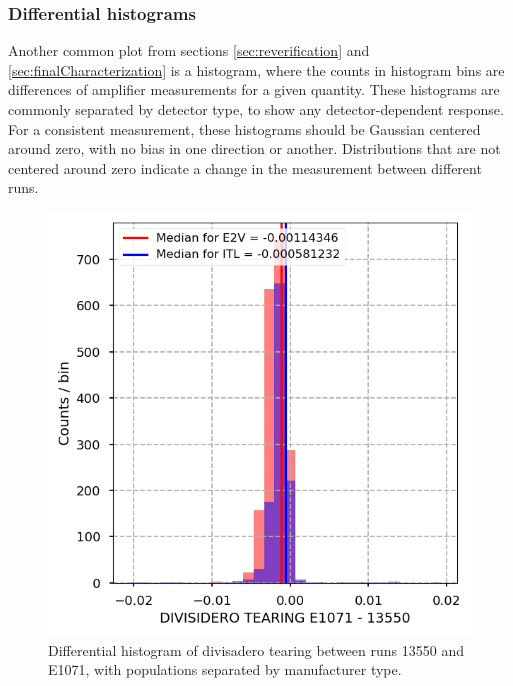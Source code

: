 \clearpage
\subsubsection{Differential histograms}

Another common plot from sections \ref{sec:reverification} and \ref{sec:finalCharacterization} is a histogram, where the counts in histogram bins are differences of amplifier measurements for a given quantity. These histograms are commonly separated by detector type, to show any detector-dependent response. For a consistent measurement, these histograms should be Gaussian centered around zero, with no bias in one direction or another. Distributions that are not centered around zero indicate a change in the measurement between different runs.

\begin{figure}
    \centering
    \includegraphics[width=0.8\linewidth]{figures/baselineCharacterization/DIVISIDERO_TEARING_13550_E1071_diff.png}
    \caption{Differential histogram of divisadero tearing between runs 13550 and E1071, with populations separated by manufacturer type.}
    \label{fig:ref:histDiff}
\end{figure}

\clearpage

